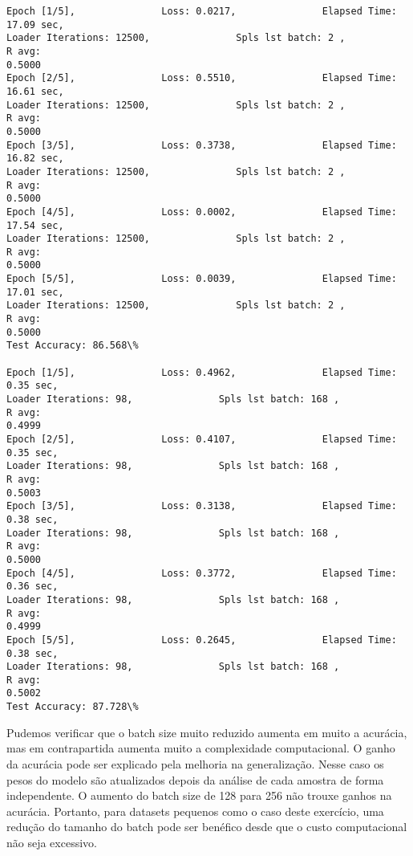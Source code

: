 \documentclass[11pt]{article}
\begin{document}
    \begin{Verbatim}[commandchars=\\\{\}]
Epoch [1/5],               Loss: 0.0217,               Elapsed Time: 17.09 sec,
Loader Iterations: 12500,               Spls lst batch: 2 ,               R avg:
0.5000
Epoch [2/5],               Loss: 0.5510,               Elapsed Time: 16.61 sec,
Loader Iterations: 12500,               Spls lst batch: 2 ,               R avg:
0.5000
Epoch [3/5],               Loss: 0.3738,               Elapsed Time: 16.82 sec,
Loader Iterations: 12500,               Spls lst batch: 2 ,               R avg:
0.5000
Epoch [4/5],               Loss: 0.0002,               Elapsed Time: 17.54 sec,
Loader Iterations: 12500,               Spls lst batch: 2 ,               R avg:
0.5000
Epoch [5/5],               Loss: 0.0039,               Elapsed Time: 17.01 sec,
Loader Iterations: 12500,               Spls lst batch: 2 ,               R avg:
0.5000
Test Accuracy: 86.568\%

Epoch [1/5],               Loss: 0.4962,               Elapsed Time: 0.35 sec,
Loader Iterations: 98,               Spls lst batch: 168 ,               R avg:
0.4999
Epoch [2/5],               Loss: 0.4107,               Elapsed Time: 0.35 sec,
Loader Iterations: 98,               Spls lst batch: 168 ,               R avg:
0.5003
Epoch [3/5],               Loss: 0.3138,               Elapsed Time: 0.38 sec,
Loader Iterations: 98,               Spls lst batch: 168 ,               R avg:
0.5000
Epoch [4/5],               Loss: 0.3772,               Elapsed Time: 0.36 sec,
Loader Iterations: 98,               Spls lst batch: 168 ,               R avg:
0.4999
Epoch [5/5],               Loss: 0.2645,               Elapsed Time: 0.38 sec,
Loader Iterations: 98,               Spls lst batch: 168 ,               R avg:
0.5002
Test Accuracy: 87.728\%

    \end{Verbatim}

    Pudemos verificar que o batch size muito reduzido aumenta em muito a
acurácia, mas em contrapartida aumenta muito a complexidade
computacional. O ganho da acurácia pode ser explicado pela melhoria na
generalização. Nesse caso os pesos do modelo são atualizados depois da
análise de cada amostra de forma independente. O aumento do batch size
de 128 para 256 não trouxe ganhos na acurácia. Portanto, para datasets
pequenos como o caso deste exercício, uma redução do tamanho do batch
pode ser benéfico desde que o custo computacional não seja excessivo.
\end{document}

